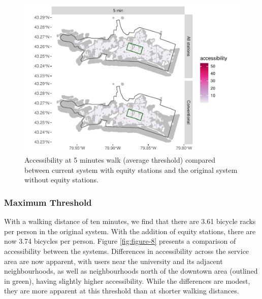 \documentclass[]{elsarticle} %
\begin{document}
\begin{figure}

{\centering \includegraphics[width=0.9\linewidth]{Bike-share-spatial-equity_files/figure-latex/figure-7-1} 

}

\caption{Accessibility at 5 minutes walk (average threshold) compared between current system with equity stations and the original system without equity stations.}\label{fig:figure-7}
\end{figure}

\hypertarget{maximum-threshold}{%
\subsubsection{Maximum Threshold}\label{maximum-threshold}}

With a walking distance of ten minutes, we find that there are 3.61
bicycle racks per person in the original system. With the addition of
equity stations, there are now 3.74 bicycles per person. Figure
\ref{fig:figure-8} presents a comparison of accessibility between the
systems. Differences in accessibility across the service area are now
apparent, with users near the university and its adjacent
neighbourhoods, as well as neighbourhoods north of the downtown area
(outlined in green), having slightly higher accessibility. While the
differences are modest, they are more apparent at this threshold than at
shorter walking distances.
\end{document}
